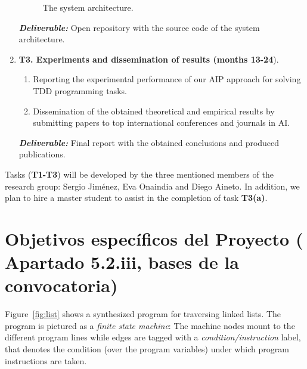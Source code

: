 \documentclass[10pt,a4paper]{paper}
\begin{document}
\begin{enumerate}
\begin{figure}[hbt!]
\begin{center}
\end{center}  
\caption{\small The system architecture.}
\label{fig:architecture}
\end{figure}

{\small{\bf\em Deliverable:} Open repository with the source code of the system architecture.}
    
\item {\bf T3. Experiments and dissemination of results (months 13-24}).
   \begin{small}
      \begin{enumerate}
      \item Reporting the experimental performance of our AIP approach for solving TDD programming tasks.
      \item Dissemination of the obtained theoretical and empirical results by submitting papers to top international conferences and journals in AI.        
      \end{enumerate}
\end{small}        
{\small{\bf\em  Deliverable:} Final report with the obtained conclusions and produced publications.}
\end{enumerate}

Tasks ({\bf T1-T3}) will be developed by the three mentioned members of the research group: Sergio Jiménez, Eva Onaindia and Diego Aineto. In addition, we plan to hire a master student to assist in the completion of task {\bf T3(a)}.


\newpage
\section{Objetivos específicos del Proyecto ( Apartado 5.2.iii, bases de la convocatoria)}
\label{subsec:objectivos}

Figure~\ref{fig:list} shows a synthesized program for traversing linked lists. The program is pictured as a {\em finite state machine}: The machine nodes mount to the different program lines while edges are tagged with a {\em condition/instruction} label, that denotes the condition (over the program variables) under which program instructions are taken.  
\end{document}
